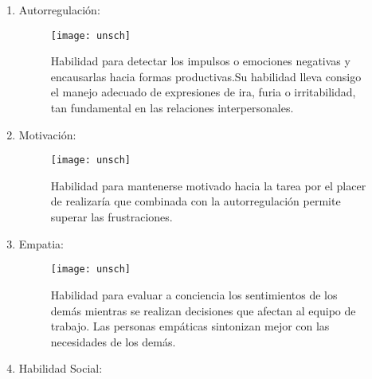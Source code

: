 \begin{enumerate}[label=\itembolasazules{\arabic*}]
\item Autorregulación: \\
\begin{figure}[!h]
		\begin{minipage}[b]{0.25\textwidth}
			\hspace{1cm} {\texttt{[image: unsch]}}%
		\end{minipage} \hfill \begin{minipage}[b]{0.73\textwidth}
			Habilidad para detectar los impulsos o emociones negativas y encausarlas hacia formas productivas.Su habilidad lleva consigo el manejo adecuado de expresiones de ira, furia o irritabilidad, tan fundamental en las relaciones interpersonales.
	\end{minipage}
\end{figure}
\item Motivación: 
\begin{figure}[!h]
		\begin{minipage}[b]{0.25\textwidth}
			\hspace{1cm} {\texttt{[image: unsch]}}%
		\end{minipage} \hfill \begin{minipage}[b]{0.73\textwidth}
			Habilidad para mantenerse motivado hacia la tarea por el placer de realizaría que combinada con la autorregulación permite superar las frustraciones.
	\end{minipage}
\end{figure}
\item Empatia: 
\begin{figure}[!h]
		\begin{minipage}[b]{0.15\textwidth}
			\hspace{1cm} {\texttt{[image: unsch]}}%
		\end{minipage} \hfill \begin{minipage}[b]{0.83\textwidth}
			Habilidad para evaluar a conciencia los sentimientos de los demás mientras se realizan decisiones que afectan al equipo de trabajo. Las personas empáticas sintonizan mejor con las necesidades de los demás.
	\end{minipage}
\end{figure}
\item Habilidad Social:
\begin{figure}[!h]

\end{figure}
\end{enumerate}
